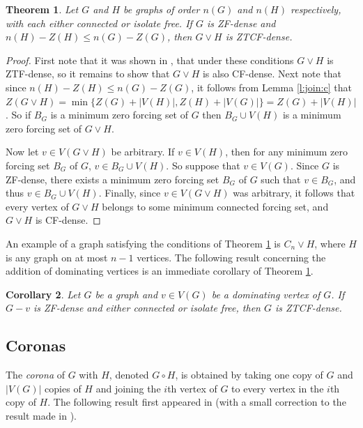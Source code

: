 \documentclass[11pt]{article}
\newtheorem{thm}{Theorem}
\newtheorem{cor}[thm]{Corollary}
\theoremstyle{definition}
\newcommand{\1}{\vspace{0.1cm}}
\newcommand{\2}{\vspace{0.2cm}}
\newcommand{\3}{\vspace{0.3cm}}
\begin{document}
\begin{thm}\label{joinZTC}
Let $G$ and $H$ be graphs of order $n(G)$ and $n(H)$ respectively, with each either connected or isolate free.  If $G$ is ZF-dense and $n(H)-Z(H) \leq n(G)-Z(G)$, then $G \vee H$ is ZTCF-dense.
\end{thm}

\begin{proof}
First note that it was shown in \cite{DaHePe2023a}, that under these conditions $G \vee H$ is ZTF-dense, so it remains to show that $G \vee H$ is also CF-dense.  Next note that since $n(H)-Z(H) \leq n(G)-Z(G)$, it follows from Lemma \ref{l:join:c} that $Z(G \vee H)=\min\{Z(G)+|V(H)|,Z(H)+|V(G)|\}=Z(G) + |V(H)|$.  So if $B_G$ is a minimum zero forcing set of $G$ then $B_G \cup V(H)$ is a minimum zero forcing set of $G \vee H$.

Now let $v \in V(G \vee H)$ be arbitrary.  If $v \in V(H)$, then for any minimum zero forcing set $B_G$ of $G$, $v \in B_G \cup V(H)$.  So suppose that $v \in V(G)$.  Since $G$ is ZF-dense, there exists a minimum zero forcing set $B_G$ of $G$ such that $v \in B_G$, and thus $v \in B_G \cup V(H)$.  Finally, since $v \in V(G \vee H)$ was arbitrary, it follows that every vertex of $G \vee H$ belongs to some minimum connected forcing set, and $G \vee H$ is CF-dense. 
\end{proof}

An example of a graph satisfying the conditions of Theorem \ref{joinZTC} is $C_n \vee H$, where $H$ is any graph on at most $n-1$ vertices.  The following result concerning the addition of dominating vertices is an immediate corollary of Theorem \ref{joinZTC}.

\begin{cor}
Let $G$ be a graph and $v \in V(G)$ be a dominating vertex of $G$.  If $G-v$ is ZF-dense and either connected or isolate free, then $G$ is ZTCF-dense.
\end{cor}

\subsection{Coronas}

The \emph{corona} of $G$ with $H$, denoted $G\circ H$, is obtained by taking one copy of $G$ and $|V(G)|$ copies of $H$ and joining the $i$th vertex of $G$ to every vertex in the $i$th copy of $H$.  The following result first appeared in \cite{ZGcircKs} (with a small correction to the result made in \cite{cartfrac}).  
\end{document}
